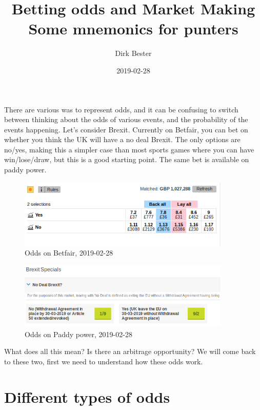 \documentclass[a4paper]{article}
\title{Betting odds and Market Making\\
{\Large Some mnemonics for punters}
}
\author{Dirk Bester}
\date{2019-02-28}
\begin{document}
\maketitle

There are various was to represent odds, and it can be confusing to switch between thinking about the odds of various events, and the probability of the events happening.
Let's consider Brexit.
Currently on Betfair, you can bet on whether you think the UK will have a no deal Brexit.
The only options are no/yes, making this a simpler case than most sports games where you can have win/lose/draw, but this is a good starting point.
The same bet is available on paddy power.

\begin{figure}[htb]
\begin{center}
\includegraphics[width=0.9\textwidth]{Brexit_deal_betfair.png}
\caption{Odds on Betfair, 2019-02-28}
\label{fig:odds:betfair}
\end{center}
\end{figure}
\begin{figure}[htb]
\begin{center}
\includegraphics[width=0.9\textwidth]{Brexit_deal_paddy_power.png}
\caption{Odds on Paddy power, 2019-02-28}
\label{fig:odds:paddypower}
\end{center}
\end{figure}

What does all this mean? Is there an arbitrage opportunity?
We will come back to these two, first we need to understand how these odds work.


\section{Different types of odds}
\end{document}
